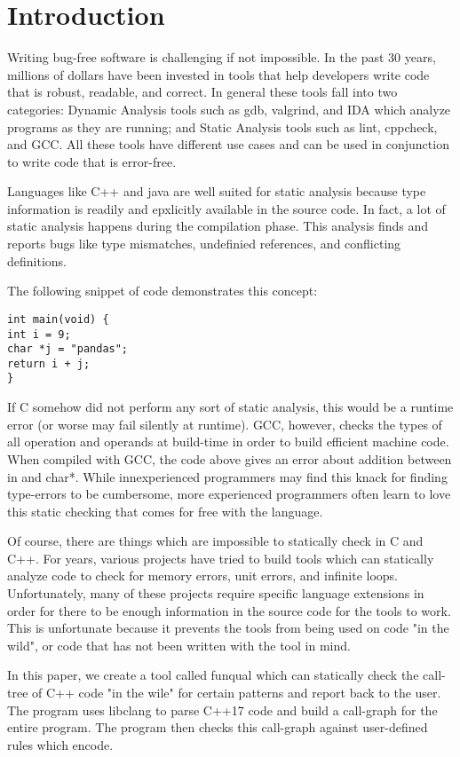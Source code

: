 \chapter{Introduction}

Writing bug-free software is challenging if not impossible.  In the past 30 years, millions of dollars have been invested in tools that help developers write code that is robust, readable, and correct.  In general these tools fall into two categories:  Dynamic Analysis tools such as gdb, valgrind, and IDA which analyze programs as they are running; and Static Analysis tools such as lint, cppcheck, and GCC.  All these tools have different use cases and can be used in conjunction to write code that is error-free.

Languages like C++ and java are well suited for static analysis because type information is readily and epxlicitly available in the source code.  In fact, a lot of static analysis happens during the compilation phase.  This analysis finds and reports bugs like type mismatches, undefinied references, and conflicting definitions.  

The following snippet of code demonstrates this concept:

\begin{lstlisting}
int main(void) {
int i = 9;
char *j = "pandas";
return i + j;
}
\end{lstlisting}

If C somehow did not perform any sort of static analysis, this would be a runtime error (or worse may fail silently at runtime).  GCC, however, checks the types of all operation and operands at build-time in order to build efficient machine code.  When compiled with GCC, the code above gives an error about addition between in and char*.  While innexperienced programmers may find this knack for finding type-errors to be cumbersome, more experienced programmers often learn to love this static checking that comes for free with the language.

Of course, there are things which are impossible to statically check in C and C++.  For years, various projects have tried to build tools which can statically analyze code to check for memory errors, unit errors, and infinite loops.  Unfortunately, many of these projects require specific language extensions in order for there to be enough information in the source code for the tools to work.  This is unfortunate because it prevents the tools from being used on code "in the wild", or code that has not been written with the tool in mind.

In this paper, we create a tool called funqual which can statically check the call-tree of C++ code "in the wile" for certain patterns and report back to the user.  The program uses libclang to parse C++17 code and build a call-graph for the entire program.  The program then checks this call-graph against user-defined rules which encode.
